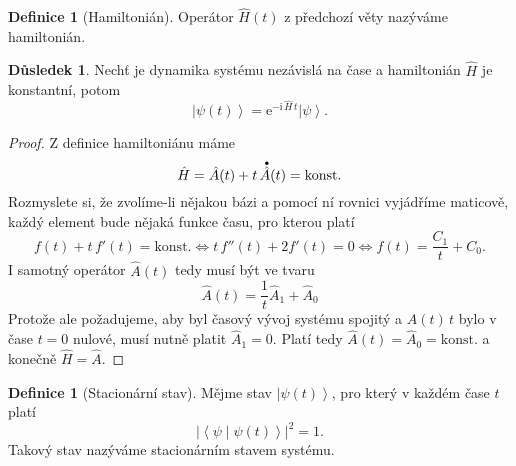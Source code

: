 \documentclass[10pt,a4paper]{article}
\theoremstyle{definition}
\newtheorem{definition}[theorem]{Definice}
\newtheorem{corollary}[theorem]{Důsledek}
\newcommand{\const}[1]{\mathrm{#1}}
\newcommand{\abs}[1]{\left| #1 \right|}
\newcommand{\ket}[1]{\left| #1 \right>}
\newcommand{\braket}[2]{\left< #1 \middle| #2 \right>}
\newcommand{\e}[1]{\const{e}^{#1}}
\renewcommand{\i}{\const{i}}
\newcommand{\bigdot}[1]{\accentset{\bullet}{#1}}
\def\konst{\mathrm{konst.}}
\begin{document}
\begin{definition}[Hamiltonián]
    Operátor $\hat H(t)$ z předchozí věty nazýváme hamiltonián.
\end{definition}

\begin{corollary}
    Nechť je dynamika systému nezávislá na čase a hamiltonián $\hat H$ je konstantní, potom
    \begin{equation*}
        \ket{\psi(t)} = \e{-\i \, \hat{H} \, t} \ket{\psi}.
    \end{equation*}
\end{corollary}
\begin{proof}
    Z definice hamiltoniánu máme
    \begin{equation*}
        \hat H = \hat A(t) + t \, \bigdot{\hat A}(t) = \konst
    \end{equation*}
    Rozmyslete si, že zvolíme-li nějakou bázi a pomocí ní rovnici vyjádříme maticově, každý element bude nějaká funkce času, pro kterou platí
    \begin{equation*}
        f(t) + t \, f'(t) = \konst
        \iff
        t \, f''(t) + 2 f'(t) = 0
        \iff
        f(t) = \frac{C_1}{t} + C_0.
    \end{equation*}
    I samotný operátor $\hat A(t)$ tedy musí být ve tvaru
    \begin{equation*}
        \hat A(t) = \frac{1}{t} \hat A_1 + \hat A_0
    \end{equation*}
    Protože ale požadujeme, aby byl časový vývoj systému spojitý a $\hat A(t) \, t$ bylo v čase $t=0$ nulové, musí nutně platit $\hat A_1 = 0$. Platí tedy $\hat A(t) = \hat A_0 = \konst$ a konečně $\hat H = \hat A$.
\end{proof}

\begin{definition}[Stacionární stav]
    Mějme stav $\ket{\psi(t)}$, pro který v každém čase $t$ platí
    \begin{equation*}
        \abs{\braket{\psi}{\psi(t)}}^2 = 1.
    \end{equation*}
    Takový stav nazýváme stacionárním stavem systému.
\end{definition}
\end{document}
